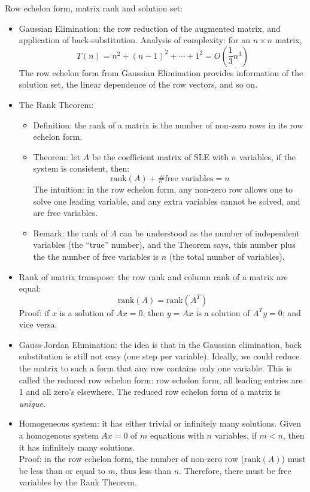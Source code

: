 \documentclass{report}
\begin{document}
Row echelon form, matrix rank and solution set: 
\begin{itemize}
\item Gaussian Elimination: the row reduction of the augmented matrix, and application of back-substitution. Analysis of complexity: for an $n \times n$ matrix,  
\begin{equation}
T(n) = n^2 + (n-1)^2 + \cdots + 1^2 = O\left(\frac{1}{3} n^3\right)	
\end{equation}
The row echelon form from Gaussian Elimination provides information of the solution set, the linear dependence of the row vectors, and so on. 

\item The Rank Theorem: 
\begin{itemize}
\item Definition: the rank of a matrix is the number of non-zero rows in its row echelon form. 
\item Theorem: let $A$ be the coefficient matrix of SLE with $n$ variables, if the system is consistent, then:
\begin{equation}
\text{rank}(A) + \text{\#free variables} = n	
\end{equation}
The intuition: in the row echelon form, any non-zero row allows one to solve one leading variable, and any extra variables cannot be solved, and are free variables. 
\item Remark: the rank of $A$ can be understood as the number of independent variables (the ``true'' number), and the Theorem says, this number plus the the number of free variables is $n$ (the total number of variables). 
\end{itemize}

\item Rank of matrix transpose: the row rank and column rank of a matrix are equal: 
\begin{equation}
\text{rank}(A) = \text{rank}(A^T)
\end{equation}
Proof: if $x$ is a solution of $Ax = 0$, then $y = Ax$ is a solution of $A^T y = 0$; and vice versa. 

\item Gauss-Jordan Elimination: the idea is that in the Gaussian elimination, back substitution is still not easy (one step per variable). Ideally, we could reduce the matrix to such a form that any row contains only one variable. This is called the reduced row echelon form: row echelon form, all leading entries are 1 and all zero's elsewhere. The reduced row echelon form of a matrix is \textit{unique}.  

\item Homogeneous system: it has either trivial or infinitely many solutions. Given a homogenous system $Ax = 0$ of $m$ equations with $n$ variables, if $m < n$, then it has infinitely many solutions. \\
Proof: in the row echelon form, the number of non-zero row ($\text{rank}(A)$) must be less than or equal to $m$, thus less than $n$. Therefore, there must be free variables by the Rank Theorem. 
\end{itemize}
\end{document}
